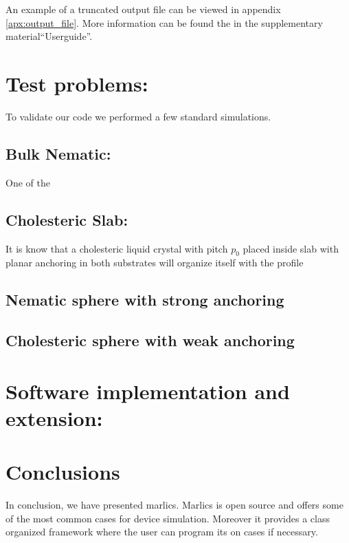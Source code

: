 \documentclass[final,5p,times,twocolumn]{elsarticle}
\begin{document}
An example of a truncated output file
can be viewed in appendix \ref{apx:output_file}.  More information can
be found the in the supplementary material``Userguide''.

\section{Test problems:}

To validate our code we performed a few standard simulations. 

\subsection{Bulk Nematic:}

One of the 

\subsection{Cholesteric Slab:}

It is know that a cholesteric liquid crystal with pitch $p_0$ placed
inside slab with planar anchoring in both substrates will organize
itself with the profile 

\subsection{Nematic sphere with strong anchoring}


\subsection{Cholesteric sphere with weak anchoring}



\section{Software implementation and extension:}

\section{Conclusions}

In conclusion, we have presented marlics. Marlics is open source and
offers some of the most common cases for device simulation. Moreover
it provides a class organized framework where the user can program its
on cases if necessary.  

\label{sec:conclusions}
\end{document}
